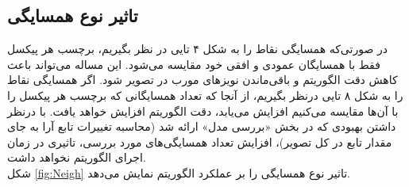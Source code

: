 \documentclass[11.5pt,a4paper]{article}
\begin{document}
\subsection{تاثیر نوع همسایگی}

در صورتی‌که همسایگی نقاط را به شکل ۴ تایی در نظر بگیریم،‌ برچسب هر پیکسل فقط با همسایگان عمودی و افقی خود مقایسه می‌شود. این مساله می‌تواند باعث کاهش دقت الگوریتم و باقی‌ماندن نویزهای مورب در تصویر شود. اگر همسایگی نقاط را به شکل ۸ تایی درنظر بگیریم،‌ از آنجا که تعداد همسایگانی که برچسب هر پیکسل را با آن‌ها مقایسه ‌می‌کنیم افزایش می‌یابد،‌ دقت الگوریتم افزایش خواهد یافت. با درنظر داشتن بهبودی که در بخش «بررسی مدل» ارائه شد (محاسبه تغییرات تابع آرا به جای مقدار تابع در کل تصویر)،‌ افزایش تعداد همسایگی‌های مورد بررسی،‌ تاثیری در زمان اجرای الگوریتم نخواهد داشت.
\\
شکل 
\ref{fig:Neigh}
تاثیر نوع همسایگی را بر عملکرد الگوریتم نمایش می‌دهد.
\end{document}
